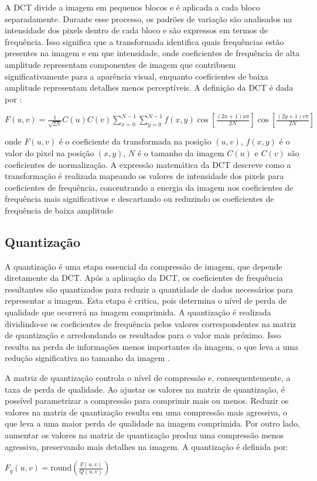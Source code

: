 A \acrshort{DCT} divide a imagem em pequenos blocos e é aplicada a cada bloco separadamente. Durante esse processo, os padrões de variação são analisados na intensidade dos pixels dentro de cada bloco e são expressos em termos de frequência. Isso significa que a transformada identifica quais frequências estão presentes na imagem e em que intensidade, onde coeficientes de frequência de alta amplitude representam componentes de imagem que contribuem significativamente para a aparência visual, enquanto coeficientes de baixa amplitude representam detalhes menos perceptíveis. A definição da \acrshort{DCT} é dada por \cite{digitalImageProcessingGonzalez}:
\BlankLine
\begin{center}
    \(\displaystyle F(u,v) = \frac{1}{\sqrt{2N}}C(u)C(v)\sum_{x=0}^{N-1}\sum_{y=0}^{N-1}f(x,y)\cos\left[\frac{(2x + 1)u\pi}{2N}\right]\cos\left[\frac{(2y + 1)v\pi}{2N}\right]\)
\end{center}
\noindent onde $F(u,v)$ é o coeficiente da transformada na posição $(u,v)$, $f(x,y)$ é o valor do pixel na posição $(x,y)$, $N$ é o tamanho da imagem $C(u)$ e $C(v)$ são coeficientes de normalização. A expressão matemática da \acrshort{DCT} descreve como a transformação é realizada mapeando os valores de intensidade dos pixels para coeficientes de frequência, concentrando a energia da imagem nos coeficientes  de frequência mais significativos e descartando ou reduzindo os coeficientes de frequência de baixa amplitude

\subsection{Quantização}
A quantização é uma etapa essencial da compressão de imagem, que depende diretamente da \acrshort{DCT}. Após a aplicação da \acrshort{DCT}, os coeficientes de frequência resultantes são quantizados para reduzir a quantidade de dados necessários para representar a imagem. Esta etapa é critica, pois determina o nível de perda de qualidade que ocorrerá na imagem comprimida. A quantização é realizada dividindo-se os coeficientes de frequência pelos valores correspondentes na matriz de quantização e arredondando os resultados para o valor mais próximo. Isso resulta na perda de informações menos importantes da imagem, o que leva a uma redução significativa no tamanho da imagem \cite{quantizationGersho}.

A matriz de quantização controla o nível de compressão e, consequentemente, a taxa de perda de qualidade. Ao ajustar os valores na matriz de quantização, é possível parametrizar a compressão para comprimir mais ou menos. Reduzir os  valores na matriz de quantização resulta em uma compressão mais agressiva, o que leva a uma maior perda de qualidade na imagem comprimida. Por outro lado, aumentar os valores na matriz de quantização produz uma compressão menos agressiva, preservando mais detalhes na imagem. A quantização é definida por: 
\BlankLine
\begin{center}
    \(\displaystyle F_q(u,v) = \text{round}\left(\frac{F(u,v)}{Q(u,v)}\right) \)
\end{center}

